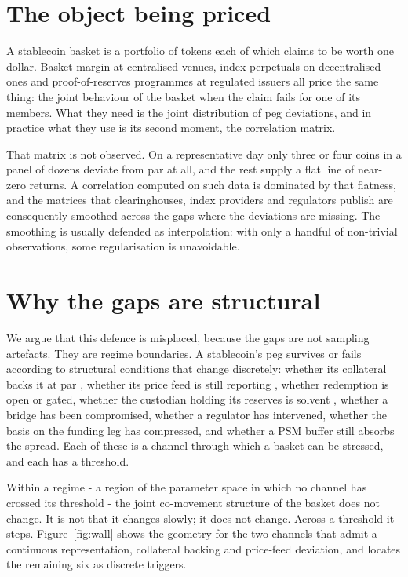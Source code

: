 \section*{The object being priced}

A stablecoin basket is a portfolio of tokens each of which claims to be worth one dollar. Basket margin at centralised venues, index perpetuals on decentralised ones and proof-of-reserves programmes at regulated issuers all price the same thing: the joint behaviour of the basket when the claim fails for one of its members. What they need is the joint distribution of peg deviations, and in practice what they use is its second moment, the correlation matrix.

That matrix is not observed. On a representative day only three or four coins in a panel of dozens deviate from par at all, and the rest supply a flat line of near-zero returns. A correlation computed on such data is dominated by that flatness, and the matrices that clearinghouses, index providers and regulators publish are consequently smoothed across the gaps where the deviations are missing. The smoothing is usually defended as interpolation: with only a handful of non-trivial observations, some regularisation is unavoidable.

\section*{Why the gaps are structural}

We argue that this defence is misplaced, because the gaps are not sampling artefacts. They are regime boundaries. A stablecoin's peg survives or fails according to structural conditions that change discretely: whether its collateral backs it at par \citep{LyonsViswanath2023}, whether its price feed is still reporting \citep{LiuLiSprenger2023}, whether redemption is open or gated, whether the custodian holding its reserves is solvent \citep{MaZengZhang2023}, whether a bridge has been compromised, whether a regulator has intervened, whether the basis on the funding leg has compressed, and whether a PSM buffer still absorbs the spread. Each of these is a channel through which a basket can be stressed, and each has a threshold.

Within a regime - a region of the parameter space in which no channel has crossed its threshold - the joint co-movement structure of the basket does not change. It is not that it changes slowly; it does not change. Across a threshold it steps. Figure~\ref{fig:wall} shows the geometry for the two channels that admit a continuous representation, collateral backing and price-feed deviation, and locates the remaining six as discrete triggers.

